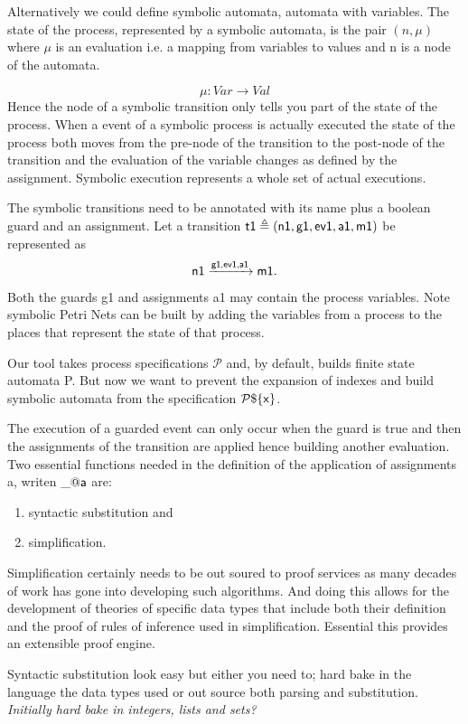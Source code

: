 \documentclass[]{article}
\begin{document}
Alternatively we could define symbolic automata, automata with variables.   
The state of  the process, represented by a symbolic automata, is   the pair $(n,\mu)$ where $\mu$ is an  evaluation i.e. a mapping from variables to values and n is a node of the automata.

\[\mu: Var \rightarrow Val\]
Hence the node of a symbolic transition only tells you part of the state of the process. When a event of a symbolic process is actually executed the state of the process both moves from the pre-node of the transition to the post-node of the transition and the evaluation of the variable changes as defined by the assignment.  Symbolic execution represents a whole set of actual executions. 

The symbolic  transitions need  to be annotated  with its name plus a boolean guard and an assignment. Let a transition  ${\sf t1 \triangleq (n1,g1,ev1,a1,m1)}$  be represented as   
\[{\sf n1\xrightarrow{\text{\sf g1,ev1,a1}} m1}.\] 
Both the guards {\sf g1} and assignments {\sf a1} may contain the process variables.  Note symbolic Petri Nets can be built by adding the variables from a process to the places that represent the state of that process.

Our tool takes process specifications $\mathcal{P}$ and,  by default, builds finite state automata {\sf P}. But now we want to prevent the expansion of indexes and build symbolic automata  from the specification ${\sf \mathcal{P}\$\{x\}}$.

The execution of a guarded  event  can only occur when the guard is true  and then the assignments of the transition are applied hence building another evaluation. Two  essential functions needed in the definition of the application of assignments {\sf a}, writen  $\_@{\sf a}$ are:
\begin{enumerate}
\item syntactic substitution and 
\item simplification. 
\end{enumerate}

Simplification certainly needs to be out soured to proof services as  many decades of work has gone into developing such algorithms. And doing this allows for the development of theories of specific data types that include both their definition and the proof of rules of inference used in simplification. Essential this provides an extensible proof engine.  

Syntactic substitution look easy but  either you need to; hard bake in the language the data types used or out source both  parsing and substitution. \emph{Initially hard bake in integers, lists and sets?}
\end{document}
